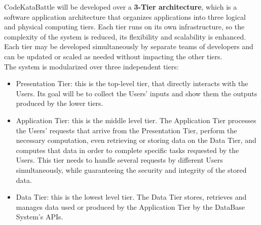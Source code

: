 CodeKataBattle will be developed over a \textbf{3-Tier architecture}, which is a software application architecture that organizes applications into three logical and physical computing tiers. Each tier runs on its own infrastructure, so the complexity of the system is reduced, its flexibility and scalability is enhanced. Each tier may be developed simultaneously by separate teams of developers and can be updated or scaled as needed without impacting the other tiers.
\\
The system is modularized over three independent tiers:
\begin{itemize}
    \item Presentation Tier: this is the top-level tier, that directly interacts with the Users. Its goal will be to collect the Users’ inputs and show them the outputs produced by the lower tiers. 
    \item Application Tier: this is the middle level tier. The Application Tier processes the Users’ requests that arrive from the Presentation Tier, perform the necessary computation, even retrieving or storing data on the Data Tier, and computes that data in order to complete specific tasks requested by the Users. This tier needs to handle several requests by different Users simultaneously, while guaranteeing the security and integrity of the stored data.
    \item Data Tier: this is the lowest level tier. The Data Tier stores, retrieves and manages data used or produced by the Application Tier by the DataBase System’s APIs.
\end{itemize}

